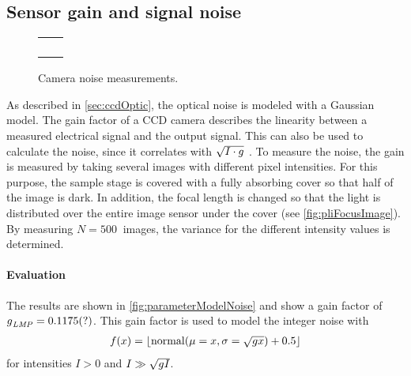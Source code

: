 \subsection{Sensor gain and signal noise}\label{sec:sensorGain}
%
\begin{figure}[!t]
\centering
%
\setlength{\tikzwidth}{0.3\textwidth}
\setlength{\tikzheight}{0.3\textwidth}
%
\setlength{\tabcolsep}{0em}
\begin{tabular}{C{0.5\textwidth}C{0.5\textwidth}}
&
\\[-1em]
%
 &
 \\[2em]
%
&
\\[-1em]
%
 &
\end{tabular}
%
\caption{Camera noise measurements.}
\label{fig:parameterModelGain}
\end{figure}
%
As described in \cref{sec:ccdOptic}, the optical noise is modeled with a Gaussian model.
The gain factor of a \ac{CCD} camera describes the linearity between a measured electrical signal and the output signal.
This can also be used to calculate the noise, since it correlates with $\sqrt{I \cdot \textnormal{$g$}}$ \cite{Wiese:887678}.
To measure the noise, the gain is measured by taking several images with different pixel intensities.
For this purpose, the sample stage is covered with a fully absorbing cover so that half of the image is dark.
In addition, the focal length is changed so that the light is distributed over the entire image sensor under the cover (see \cref{fig:pliFocusImage}).
By measuring $N=\SI{500}{}$ images, the variance for the different intensity values is determined.
%
\paragraph{Evaluation}
The results are shown in \cref{fig:parameterModelNoise} and show a gain factor of $\textnormal{$g$}_{\mathit{LMP}} = \SI{0.1175}{}(?)$.
This gain factor is used to model the integer noise with
\begin{align}
f(x) = \lfloor\mathrm{normal}(\mu = x, \sigma=\sqrt{\textnormal{$g$} x})+0.5\rfloor
\end{align}
for intensities $I > 0$ and $I \gg \sqrt{\textnormal{$g$} I}$.
%
%
%
